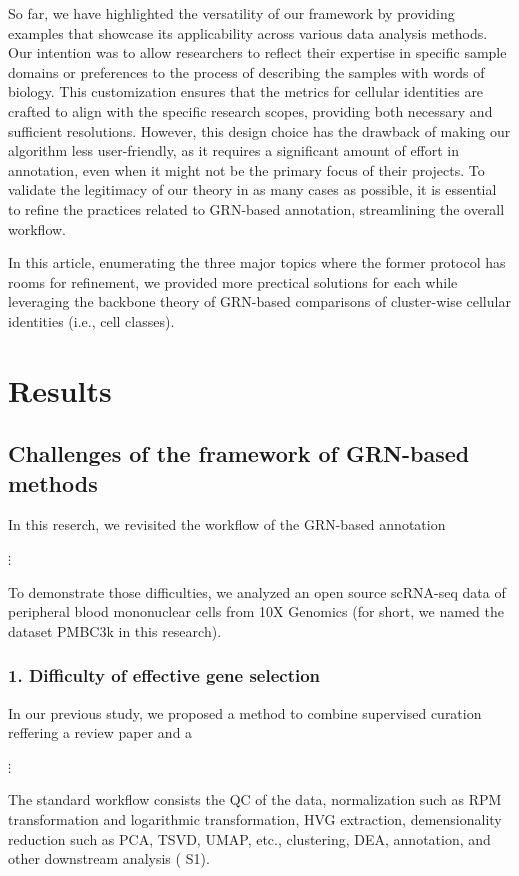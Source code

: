 \documentclass{article}
\begin{document}
So far, we have highlighted the versatility of our framework by providing examples that showcase its applicability 
across various data analysis methods. Our intention was to allow researchers to reflect their expertise in specific 
sample domains or preferences to the process of describing the samples with words of biology. This customization 
ensures that the metrics for cellular identities are crafted to align with the specific research scopes, providing both 
necessary and sufficient resolutions. However, this design choice has the drawback of making our algorithm less 
user-friendly, as it requires a significant amount of effort in annotation, even when it might not be the primary 
focus of their projects. To validate the legitimacy of our theory in as many cases as possible, it is essential to refine 
the practices related to GRN-based annotation, streamlining the overall workflow.

In this article, enumerating the three major topics where the former protocol has rooms for refinement, we 
provided more prectical solutions for each while leveraging the backbone theory of GRN-based comparisons of cluster-wise
cellular identities (i.e., cell classes).

\section*{Results}
\subsection*{Challenges of the framework of GRN-based methods}
In this reserch, we revisited the workflow of the GRN-based annotation

$\vdots$

To demonstrate those difficulties, we analyzed an open source scRNA-seq data of peripheral blood mononuclear 
cells from 10X Genomics (for short, we named the dataset PMBC3k in this research).

\subsubsection*{1. Difficulty of effective gene selection}
In our previous study, we proposed a method to combine supervised curation reffering a review paper and a 

$\vdots$

The standard workflow consists the \ac{QC} of the data, normalization such as \ac{RPM} transformation and logarithmic transformation, \ac{HVG} extraction, demensionality reduction such as \ac{PCA}, 
\ac{TSVD}, \ac{UMAP}\cite{umap}, etc., clustering, \ac{DEA}, annotation, and other downstream analysis (\figurename{ S1}).
\end{document}
